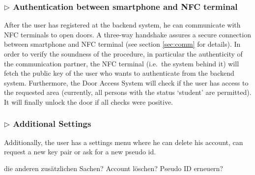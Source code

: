 


\subsubsection*{$\triangleright$ Authentication between smartphone and NFC terminal}

After the user has registered at the backend system, he can communicate with NFC terminals to open doors. 
A three-way handshake assures a secure connection between smartphone and NFC terminal (see section \ref{sec:comm} for details).
In order to verify the soundness of the procedure, in particular the authenticity of the communication partner, the NFC terminal (i.e.~the system behind it) will fetch the public key of the user who wants to authenticate from the backend system.
Furthermore, the Door Access System will check if the user has access to the requested area (currently, all persons with the status `student' are permitted).
It will finally unlock the door if all checks were positive.

\subsubsection*{$\triangleright$ Additional Settings}
Additionally, the user has a settings menu where he can delete his account, can request a new key pair or ask for a new pseudo id.


\medskip




die anderen zusätzlichen Sachen? Account löschen? Pseudo ID erneuern?
